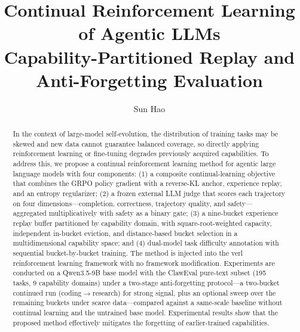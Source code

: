 \documentclass[11pt]{article}
\title{Continual Reinforcement Learning of Agentic LLMs\\
       \large Capability-Partitioned Replay and Anti-Forgetting Evaluation}
\author{Sun Hao}
\date{}
\begin{document}
\maketitle

\begin{abstract}
In the context of large-model self-evolution, the distribution of training tasks may be skewed and new data cannot guarantee balanced coverage, so directly applying reinforcement learning or fine-tuning degrades previously acquired capabilities. To address this, we propose a continual reinforcement learning method for agentic large language models with four components: (1) a composite continual-learning objective that combines the GRPO policy gradient with a reverse-KL anchor, experience replay, and an entropy regularizer; (2) a frozen external LLM judge that scores each trajectory on four dimensions---completion, correctness, trajectory quality, and safety---aggregated multiplicatively with safety as a binary gate; (3) a nine-bucket experience replay buffer partitioned by capability domain, with square-root-weighted capacity, independent in-bucket eviction, and distance-based bucket selection in a multidimensional capability space; and (4) dual-model task difficulty annotation with sequential bucket-by-bucket training. The method is injected into the verl reinforcement learning framework with no framework modification. Experiments are conducted on a Qwen3.5-9B base model with the ClawEval pure-text subset (195 tasks, 9 capability domains) under a two-stage anti-forgetting protocol---a two-bucket continued run (coding$\rightarrow$research) for strong signal, plus an optional sweep over the remaining buckets under scarce data---compared against a same-scale baseline without continual learning and the untrained base model. Experimental results show that the proposed method effectively mitigates the forgetting of earlier-trained capabilities.
\end{abstract}








\appendix

\end{document}
